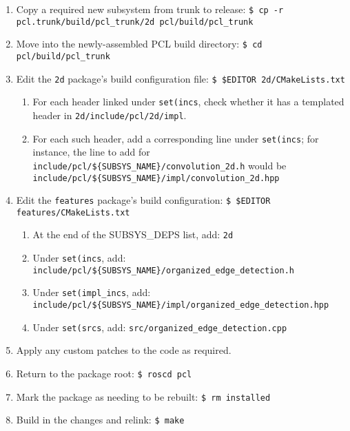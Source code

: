 \documentclass[12pt]{report}
\begin{document}
\begin{sloppypar}
\begin{enumerate}
\item{Copy a required new subsystem from trunk to release: \texttt{\$\ cp -r pcl.trunk/build/pcl\_trunk/2d pcl/build/pcl\_trunk}}
\item{Move into the newly-assembled PCL build directory: \texttt{\$\ cd pcl/build/pcl\_trunk}}
\item{Edit the \texttt{2d} package's build configuration file: \texttt{\$\ \$EDITOR 2d/CMakeLists.txt}}
\begin{enumerate}
\item{For each header linked under \texttt{set(incs}, check whether it has a templated header in \texttt{2d/include/pcl/2d/impl}.}
\item{For each such header, add a corresponding line under \texttt{set(incs}; for instance, the line to add for \texttt{include/pcl/\$\{SUBSYS\_NAME\}/convolution\_2d.h} would be \texttt{include/pcl/\$\{SUBSYS\_NAME\}/impl/convolution\_2d.hpp}}
\end{enumerate}
\item{Edit the \texttt{features} package's build configuration: \texttt{\$\ \$EDITOR features/CMakeLists.txt}}
\begin{enumerate}
\item{At the end of the SUBSYS\_DEPS list, add: \texttt{2d}}
\item{Under \texttt{set(incs}, add: \texttt{include\slash pcl\slash \$\{SUBSYS\_NAME\}\slash organized\_edge\_detection.h}}
\item{Under \texttt{set(impl\_incs}, add: \texttt{include\slash pcl\slash \$\{SUBSYS\_NAME\}\slash impl\slash organized\_edge\_detection.hpp}}
\item{Under \texttt{set(srcs}, add: \texttt{src/organized\_edge\_detection.cpp}}
\end{enumerate}
\item{Apply any custom patches to the code as required.}
\item{Return to the package root: \texttt{\$\ roscd pcl}}
\item{Mark the package as needing to be rebuilt: \texttt{\$\ rm installed}}
\item{Build in the changes and relink: \texttt{\$\ make}}
\end{enumerate}
\end{sloppypar}
\end{document}
